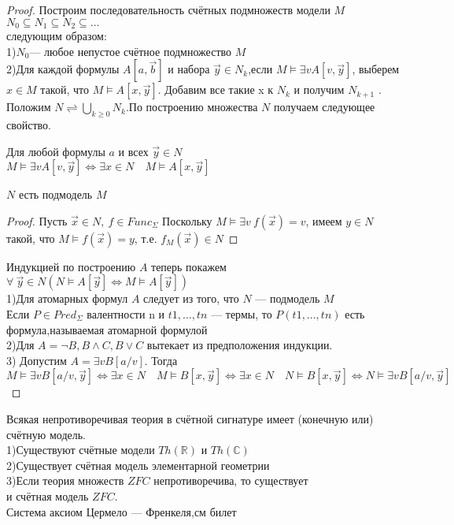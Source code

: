 \begin{proof}
    Построим последовательность счётных подмножеств модели $M$\\
    $N_{0} \subseteq N_{1} \subseteq N_{2} \subseteq \ldots$\\
    следующим образом:\\
    1)$N_0$— любое непустое счётное подмножество $M$\\
    2)Для каждой формулы $A[a, \vec{b}]$ и набора $\vec{y} \in N_{k}$,если $M \vDash \exists v A[v, \vec{y}]$, выберем $x \in M$
    такой, что $M \vDash A[x, \vec{y}]$. Добавим все такие x к $N_k$ и получим $N_{k+1}$ .\\
    Положим $N \rightleftharpoons \bigcup_{k \geq 0} N_{k}$.По построению множества $N$ получаем следующее
    свойство.
    \begin{lemma}
        Для любой формулы $a$ и всех $\vec{y} \in N$\\
        $M \vDash \exists v A[v, \vec{y}] \Longleftrightarrow \exists x \in N \quad M \vDash A[x, \vec{y}]$
    \end{lemma}
    \begin{lemma}
        $N$ есть подмодель $M$
    \end{lemma}
    \begin{proof}
        Пусть $\vec{x} \in N,\:f\in Func_\Sigma$ Поскольку $M \vDash \exists v \: f(\vec{x})=v$, имеем $y\in N$ такой, что $M \vDash f(\vec{x})=y$, т.е. $f_M(\vec{x})\in N$
    \end{proof}
    Индукцией по построению $A$ теперь покажем\\
    $\forall \: \vec{y}\in N (N \vDash A[\vec{y}] \Longleftrightarrow M \vDash A[\vec{y}])$\\
    1)Для атомарных формул $A$ следует из того, что $N$ — подмодель $M$\\
    \textcolor{mygray}{Если $P\in Pred_\Sigma$ валентности n и $t1, . . . ,tn$ —
    термы, то $P(t1, . . . ,tn)$ есть формула,называемая атомарной формулой}\\
    2)Для $A=\neg B, B \wedge C, B \vee C$ вытекает из предположения индукции.\\
    3) Допустим $A=\exists v B[a / v]$. Тогда\\
    $M \vDash \exists v B[a / v, \vec{y}] \Longleftrightarrow \exists x \in N \quad M \vDash B[x, \vec{y}]\Longleftrightarrow \exists x \in N \quad N \vDash B[x, \vec{y}] \Longleftrightarrow N \vDash \exists v B[a / v, \vec{y}]$
\end{proof}
\begin{corollary}
    Всякая непротиворечивая теория в счётной сигнатуре имеет (конечную или) счётную модель.\\
    1)Существуют счётные модели $Th(\mathbb{R})$ и $Th(\mathbb{C})$\\
    2)Существует счётная модель элементарной геометрии\\
    3)Если теория множеств $ZFC$ непротиворечива, то существует\\ и счётная модель $ZFC$.\\ \textcolor{mygray}{Система аксиом Цермело — Френкеля,см билет}
\end{corollary}
